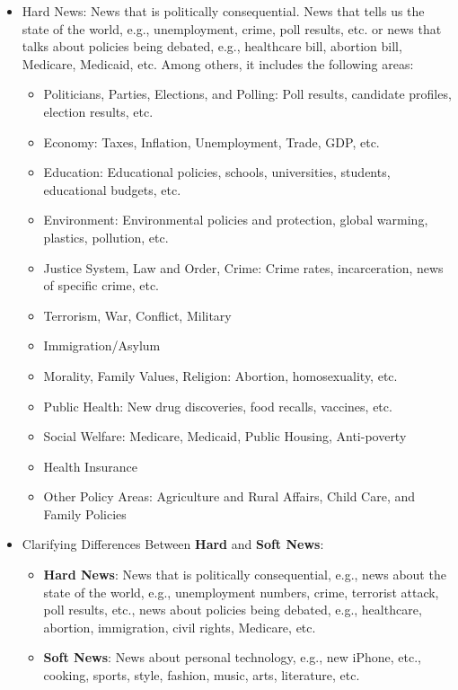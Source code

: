 \documentclass[12pt, letterpaper]{article}
\begin{document}
\begin{itemize}
\begin{itemize}
            \item Hard News: News that is politically consequential. News that tells us the state of the world, e.g., unemployment, crime, poll results, etc. or news that talks about policies being debated, e.g., healthcare bill, abortion bill, Medicare, Medicaid, etc. Among others, it includes the following areas:
            \begin{itemize}
                \item Politicians, Parties, Elections, and Polling: Poll results, candidate profiles, election results, etc.
                \item Economy: Taxes, Inflation, Unemployment, Trade, GDP, etc.
                \item Education: Educational policies, schools, universities, students, educational budgets, etc.
                \item Environment: Environmental policies and protection, global warming, plastics, pollution, etc.
                \item Justice System, Law and Order, Crime: Crime rates, incarceration, news of specific crime, etc.
                \item Terrorism, War, Conflict, Military
                \item Immigration/Asylum
                \item Morality, Family Values, Religion: Abortion, homosexuality, etc.
                \item Public Health: New drug discoveries, food recalls, vaccines, etc.
                \item Social Welfare: Medicare, Medicaid, Public Housing, Anti-poverty
                \item Health Insurance
                \item Other Policy Areas: Agriculture and Rural Affairs, Child Care, and Family Policies
            \end{itemize}
        \item Clarifying Differences Between \textbf{Hard} and \textbf{Soft News}:
            \begin{itemize}
                \item \textbf{Hard News}: News that is politically consequential, e.g., news about the state of the world, e.g., unemployment numbers, crime, terrorist attack, poll results, etc., news about policies being debated, e.g., healthcare, abortion, immigration, civil rights, Medicare, etc.
                \item  \textbf{Soft News}: News about personal technology, e.g., new iPhone, etc., cooking, sports, style, fashion, music, arts, literature, etc.
            \end{itemize}


\end{itemize}
\end{itemize}
\end{document}
